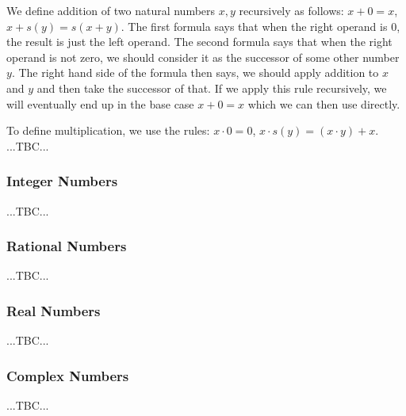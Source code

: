 We define addition of two natural numbers $x,y$ recursively as follows: $x + 0 = x$, $x + s(y) = s(x + y)$. The first formula says that when the right operand is $0$, the result is just the left operand. The second formula says that when the right operand is not zero, we should consider it as the successor of some other number $y$. The right hand side of the formula then says, we should apply addition to $x$ and $y$ and then take the successor of that. If we apply this rule recursively, we will eventually end up in the base case $x + 0 = x$ which we can then use directly.

\medskip
To define multiplication, we use the rules: $x \cdot 0 = 0$, $x \cdot s(y) = (x \cdot y) + x$. ...TBC...



\subsubsection{Integer Numbers}
...TBC...

\subsubsection{Rational Numbers}
...TBC...

\subsubsection{Real Numbers}
...TBC...

\subsubsection{Complex Numbers}
...TBC...



